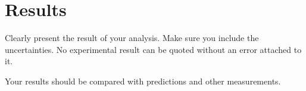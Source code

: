 \documentclass[12pt,letterpaper,twocolumn]{article}
\begin{document}
%			
%
%
%



\section{Results}

Clearly present the result of your analysis. Make sure
you include the uncertainties. No experimental result
can be quoted without an error attached to it.

Your results should be compared with predictions and other
measurements.


\end{document}

